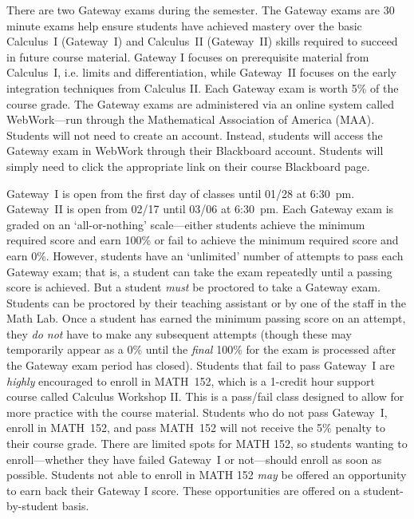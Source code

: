 \documentclass[11pt,letterpaper]{article}
\begin{document}

There are two Gateway exams during the semester. The Gateway exams are 30 minute exams help ensure students have achieved mastery over the basic Calculus~I (Gateway~I) and Calculus~II (Gateway~II) skills required to succeed in future course material. Gateway I focuses on prerequisite material from Calculus~I, i.e. limits and differentiation, while Gateway~II focuses on the early integration techniques from Calculus II. Each Gateway exam is worth 5\% of the course grade. The Gateway exams are administered via an online system called WebWork---run through the Mathematical Association of America (MAA). Students will not need to create an account. Instead, students will access the Gateway exam in WebWork through their Blackboard account. Students will simply need to click the appropriate link on their course Blackboard page. \pspace

Gateway~I is open from the first day of classes until 01/28 at 6:30~pm. Gateway~II is open from 02/17 until 03/06 at 6:30~pm. Each Gateway exam is graded on an `all-or-nothing' scale---either students achieve the minimum required score and earn 100\% or fail to achieve the minimum required score and earn 0\%. However, students have an `unlimited' number of attempts to pass each Gateway exam; that is, a student can take the exam repeatedly until a passing score is achieved. But a student \textit{must} be proctored to take a Gateway exam. Students can be proctored by their teaching assistant or by one of the staff in the Math Lab. Once a student has earned the minimum passing score on an attempt, they \textit{do not} have to make any subsequent attempts (though these may temporarily appear as a 0\% until the \textit{final} 100\% for the exam is processed after the Gateway exam period has closed). Students that fail to pass Gateway~I are \textit{highly} encouraged to enroll in MATH~152, which is a 1-credit hour support course called Calculus Workshop II. This is a pass/fail class designed to allow for more practice with the course material. Students who do not pass Gateway~I, enroll in MATH~152, and pass MATH~152 will not receive the 5\% penalty to their course grade. There are limited spots for MATH 152, so students wanting to enroll---whether they have failed Gateway~I or not---should enroll as soon as possible. Students not able to enroll in MATH 152 \textit{may} be offered an opportunity to earn back their Gateway I score. These opportunities are offered on a student-by-student basis.
\sectionbreak
\end{document}
